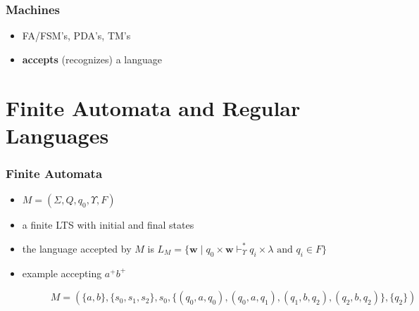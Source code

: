 \documentclass{beamer}
\begin{document}

\begin{frame}
\frametitle{Machines}
\begin{itemize}
  \item FA/FSM's, PDA's, TM's
  \item \textbf{accepts} (recognizes) a language
\end{itemize}
\end{frame}

\section{Finite Automata and Regular Languages}

\begin{frame}
\frametitle{Finite Automata}
\begin{itemize}
\item $M = (\Sigma, Q, q_0, \Upsilon, F)$
\item a finite LTS with initial and final states
\item the language accepted by $M$ is $L_M = \{\mathbf{w} \; | \; q_0 \times
  \mathbf{w} \vdash_{\Upsilon}^* q_i \times \lambda \text{ and } q_i \in F\}$
\item example accepting $a^+b^+$
\begin{figure}
  \centering
{}
\caption{$M = (\{a, b\}, \{s_0, s_1, s_2\}, s_0, \{(q_0, a, q_0), (q_0, a, q_1),
  (q_1, b, q_2), (q_2, b, q_2)\}, \{q_2\})$}
\end{figure}
\end{itemize}
\end{frame}

\end{document}
